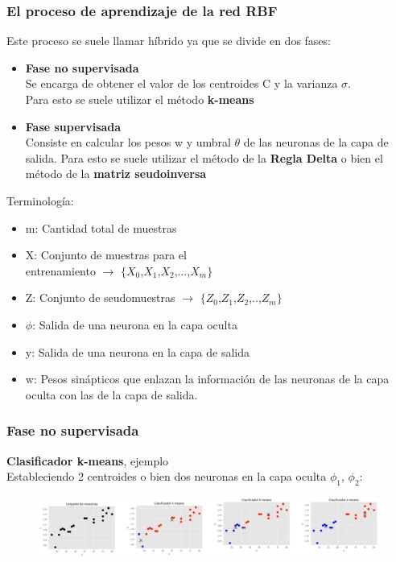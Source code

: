 \documentclass[
	11pt, %
]{beamer}
\begin{document}
\begin{frame}
  
  \frametitle{El proceso de aprendizaje de la red RBF}
  Este proceso se suele llamar híbrido ya que se divide en dos fases:\\

  \bigskip %
  
  \begin{itemize}
  \item \textbf{Fase no supervisada}\\
    Se encarga de obtener el valor de los centroides C y la varianza $\sigma$. \\
    Para esto se suele utilizar el método \textbf{k-means}

    \bigskip %
    
  \item \textbf{Fase supervisada}\\
    Consiste en calcular los pesos w y umbral $\theta$ de las neuronas de la capa de salida. Para esto se suele utilizar el método de la \textbf{Regla Delta} o bien el método de la \textbf{matriz seudoinversa}
  \end{itemize}
\end{frame}

\begin{frame}
  Terminología:
  \begin{itemize}
  \item m: Cantidad total de muestras
  \item X: Conjunto de muestras para el \\entrenamiento $\rightarrow$ $\{X_{0}$,$X_{1}$,$X_{2}$,...,$X_{m}\}$
  \item Z: Conjunto de seudomuestras $\rightarrow$ $\{Z_{0}$,$Z_{1}$,$Z_{2}$,..,$Z_{m}\}$
  \item $\phi$: Salida de una neurona en la capa oculta
  \item y: Salida de una neurona en la capa de salida
  \item w: Pesos sinápticos que enlazan la información de las neuronas de la capa oculta con las de la capa de salida.
  \end{itemize}
\end{frame}

\begin{frame}
  \frametitle{Fase no supervisada}

  \textbf{Clasificador k-means}, ejemplo\\
  Estableciendo 2 centroides o bien dos neuronas en la capa oculta $\phi_{1}$, $\phi_{2}$:

  \begin{figure}
    \includegraphics[width=1.0\linewidth]{kmeans.png}
  \end{figure}
  
\end{frame}
\end{document}
